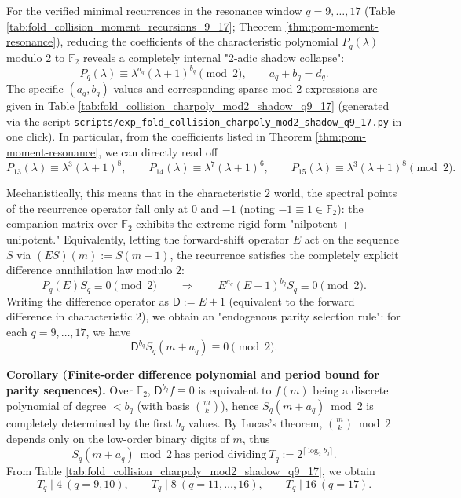 \begin{remark}\label{rem:pom-charpoly-mod2-shadow}
For the verified minimal recurrences in the resonance window \(q=9,\dots,17\) (Table \ref{tab:fold_collision_moment_recursions_9_17}; Theorem \ref{thm:pom-moment-resonance}), reducing the coefficients of the characteristic polynomial \(P_q(\lambda)\) modulo \(2\) to \(\mathbb{F}_2\) reveals a completely internal "2-adic shadow collapse":
\[
P_q(\lambda)\equiv \lambda^{a_q}(\lambda+1)^{b_q}\pmod 2,
\qquad a_q+b_q=d_q.
\]
The specific \((a_q,b_q)\) values and corresponding sparse mod \(2\) expressions are given in Table \ref{tab:fold_collision_charpoly_mod2_shadow_q9_17} (generated via the script \texttt{scripts/exp\_fold\_collision\_charpoly\_mod2\_shadow\_q9\_17.py} in one click).
In particular, from the coefficients listed in Theorem \ref{thm:pom-moment-resonance}, we can directly read off
\[
P_{13}(\lambda)\equiv \lambda^3(\lambda+1)^8,\qquad
P_{14}(\lambda)\equiv \lambda^7(\lambda+1)^6,\qquad
P_{15}(\lambda)\equiv \lambda^3(\lambda+1)^8\pmod 2.
\]
\par
Mechanistically, this means that in the characteristic \(2\) world, the spectral points of the recurrence operator fall only at \(0\) and \(-1\) (noting \(-1\equiv 1\in\mathbb{F}_2\)): the companion matrix over \(\mathbb{F}_2\) exhibits the extreme rigid form "nilpotent + unipotent."
Equivalently, letting the forward-shift operator \(E\) act on the sequence \(S\) via \((ES)(m):=S(m+1)\), the recurrence satisfies the completely explicit difference annihilation law modulo \(2\):
\[
P_q(E)S_q\equiv 0\pmod 2
\qquad\Longrightarrow\qquad
E^{a_q}(E+1)^{b_q}S_q\equiv 0\pmod 2.
\]
Writing the difference operator as \(\mathsf{D}:=E+1\) (equivalent to the forward difference in characteristic \(2\)), we obtain an "endogenous parity selection rule": for each \(q=9,\dots,17\), we have
\[
\mathsf{D}^{b_q}S_q(m+a_q)\equiv 0\pmod 2.
\]
\par
\textbf{Corollary (Finite-order difference polynomial and period bound for parity sequences).}
Over \(\mathbb{F}_2\), \(\mathsf{D}^{b_q}f\equiv 0\) is equivalent to \(f(m)\) being a discrete polynomial of degree \(<b_q\) (with basis \(\binom{m}{k}\)), hence \(S_q(m+a_q)\bmod 2\) is completely determined by the first \(b_q\) values.
By Lucas's theorem, \(\binom{m}{k}\bmod 2\) depends only on the low-order binary digits of \(m\), thus
\[
S_q(m+a_q)\bmod 2\ \text{has period dividing}\ T_q:=2^{\lceil\log_2 b_q\rceil}.
\]
From Table \ref{tab:fold_collision_charpoly_mod2_shadow_q9_17}, we obtain
\[
T_q\mid 4\ (q=9,10),\qquad
T_q\mid 8\ (q=11,\dots,16),\qquad
T_q\mid 16\ (q=17).
\]
\end{remark}

